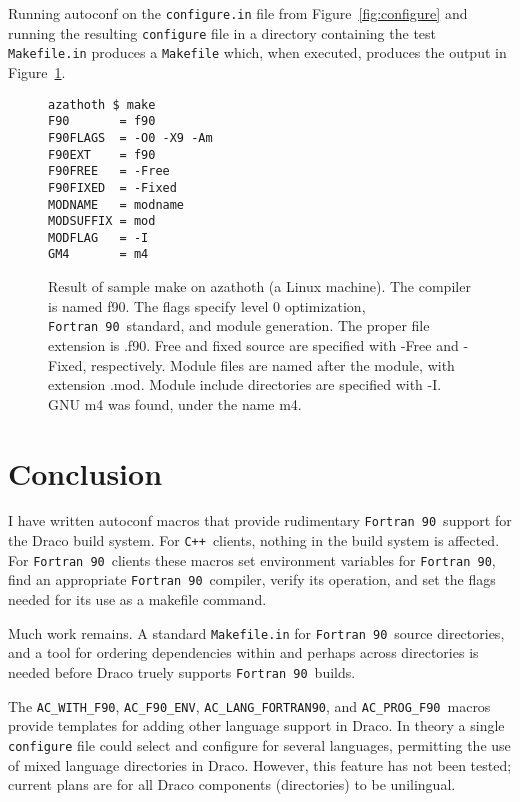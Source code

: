 \documentclass[11pt]{nmemo}
\newcommand{\fninety}{\texttt{Fortran~90}}
\newcommand{\cpp}{\texttt{C++}}
\newcommand{\fninetyenv}{\texttt{AC\_F90\_ENV}}
\newcommand{\langfninety}{\texttt{AC\_LANG\_FORTRAN90}}
\newcommand{\progfninety}{\texttt{AC\_PROG\_F90}}
\begin{document}
Running autoconf on the \texttt{configure.in} file from
Figure~\ref{fig:configure} and running the resulting
\texttt{configure} file in a directory containing the test
\texttt{Makefile.in} produces a \texttt{Makefile} which, when executed,
produces the output in Figure~\ref{fig:make}.
\begin{figure}[phbt]
\hrulefill
\begin{verbatim}
azathoth $ make
F90       = f90
F90FLAGS  = -O0 -X9 -Am
F90EXT    = f90
F90FREE   = -Free
F90FIXED  = -Fixed
MODNAME   = modname
MODSUFFIX = mod
MODFLAG   = -I
GM4       = m4
\end{verbatim}%
\caption{Result of sample make on azathoth (a Linux
machine).  The compiler is named f90.  The flags specify level 0
optimization, \fninety\ standard, and module generation.  The proper
file extension is .f90.  Free and fixed source are specified with
-Free and -Fixed, respectively.  Module files are named after the
module, with extension .mod.  Module include directories are specified
with -I.  GNU m4 was found, under the name m4.}\label{fig:make}
\hrulefill
\end{figure}

\section{Conclusion}

I have written autoconf macros that provide rudimentary \fninety\
support for the Draco build system.  For \cpp\ clients, nothing in the
build system is affected.  For \fninety\ clients these macros set
environment variables for \fninety, find an appropriate \fninety\
compiler, verify its operation, and set the flags needed for its use
as a makefile command.

Much work remains.  A standard \texttt{Makefile.in}
for \fninety\ source directories, and a tool for ordering dependencies
within and perhaps across directories is needed before Draco truely
supports \fninety\ builds.  

The \texttt{AC\_WITH\_F90}, \fninetyenv, \langfninety, and
\progfninety\ macros provide templates for adding other language
support in Draco.  In theory a single \texttt{configure} file could
select and configure for several languages, permitting the use of
mixed language directories in Draco.  However, this feature has not
been tested; current plans are for all Draco components (directories)
to be unilingual.
\end{document}
